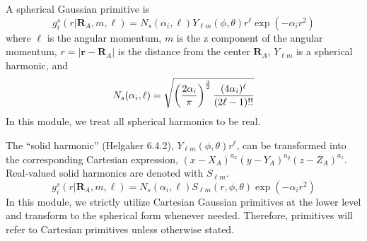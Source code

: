 \documentclass[letterpaper]{article}
\begin{document}
A spherical Gaussian primitive is
\begin{equation}
  \label{eq:sph_prim}
  g^s_i(r | \mathbf{R}_A, m, \ell) =
  N_s(\alpha_i, \ell)
  Y_{\ell m} (\phi, \theta)
  r^\ell
  \exp \left(-\alpha_i r^2 \right)
\end{equation}
where
$\ell$ is the angular momentum,
$m$ is the z component of the angular momentum,
$r = |\mathbf{r} - \mathbf{R}_A|$ is the distance from the center $\mathbf{R}_A$,
$Y_{\ell m}$ is a spherical harmonic,
and
\begin{equation}
  \label{eq:sph_norm}
  N_s (\alpha_i, \ell)
  = \sqrt{
    \left(
      \frac{2 \alpha_i}{\pi}
    \right)^{\frac{3}{2}}
    \frac{(4 \alpha_i)^{\ell}}{(2\ell - 1)!!}
  }\\
\end{equation}
In this module, we treat all spherical harmonics to be real.

The ``solid harmonic'' (Helgaker 6.4.2), $Y_{\ell m} (\phi, \theta) r^\ell$, can
be transformed into the corresponding Cartesian expression,
$(x - X_A)^{a_x} (y - Y_A)^{a_y} (z - Z_A)^{a_z}$.
Real-valued solid harmonics are denoted with $S_{\ell m}$.
\begin{equation}
  \label{eq:sph_prim_2}
  g^s_i(r | \mathbf{R}_A, m, \ell) =
  N_s(\alpha_i, \ell)
  S_{\ell m} (r, \phi, \theta)
  \exp \left(-\alpha_i r^2 \right)
\end{equation}
In this module, we strictly utilize Cartesian Gaussian primitives at the lower
level and transform to the spherical form whenever needed.
Therefore, primitives will refer to Cartesian primitives unless otherwise stated.
\end{document}
